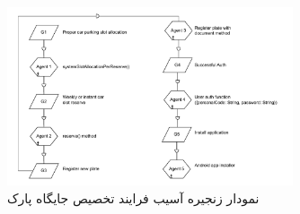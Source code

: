 \documentclass[a4paper]{report}
\begin{document}
\begin{figure}[H]
  \centering
  \includegraphics[width=0.75\textwidth]{threat_chain_smart_parking.drawio.pdf}
  \caption{نمودار زنجیره آسیب فرایند تخصیص جایگاه پارک}
\end{figure}
\end{document}
